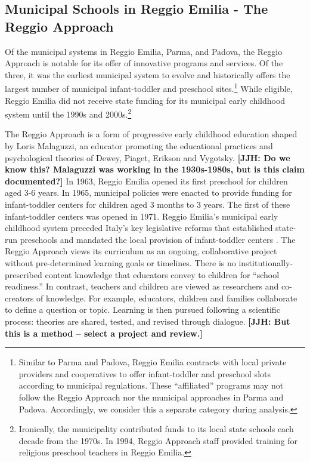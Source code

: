 
\subsection{Municipal Schools in Reggio Emilia - The Reggio Approach}

Of the municipal systems in Reggio Emilia, Parma, and Padova, the Reggio Approach is notable for its offer of innovative programs and services. Of the three, it was the earliest municipal system to evolve and historically offers the largest number of municipal infant-toddler and preschool sites.\footnote{Similar to Parma and Padova, Reggio Emilia contracts with local private providers and cooperatives to offer infant-toddler and preschool slots according to municipal regulations. These ``affiliated'' programs may not follow the Reggio Approach nor the municipal approaches in Parma and Padova. Accordingly, we consider this a separate category during analysis.} While eligible, Reggio Emilia did not receive state funding for its municipal early childhood system until the 1990s and 2000s.\footnote{Ironically, the municipality contributed funds to its local state schools each decade from the 1970s. In 1994, Reggio Approach staff provided training for religious preschool teachers in Reggio Emilia.}

The Reggio Approach is a form of progressive early childhood education shaped by Loris Malaguzzi, an educator promoting the educational practices and psychological theories of Dewey, Piaget, Erikson and Vygotsky. \textbf{[JJH: Do we know this? Malaguzzi was working in the 1930s-1980s, but is this claim documented?]} In 1963, Reggio Emilia opened its first preschool for children aged 3-6 years. In 1965, municipal policies were enacted to provide funding for infant-toddler centers for children aged 3 months to 3 years. The first of these infant-toddler centers was opened in 1971. Reggio Emilia's municipal early childhood system preceded Italy's key legislative reforms that established state-run preschools and mandated the local provision of infant-toddler centers \citep{Cagliari-etal-eds_2016_BOOK_Loris-Malaguzzi}. The Reggio Approach views its curriculum as an ongoing, collaborative project without pre-determined learning goals or timelines. There is no institutionally-prescribed content knowledge that educators convey to children for ``school readiness.'' In contrast, teachers and children are viewed as researchers and co-creators of knowledge. For example, educators, children and families collaborate to define a question or topic. Learning is then pursued following a scientific process: theories are shared, tested, and revised through dialogue. \textbf{[JJH: But this is a method -- select a project and review.]}

